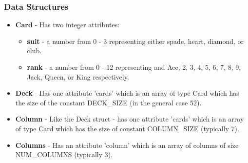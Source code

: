 \documentclass[11]{article}
\begin{document}
			\subsubsection{Data Structures}
				\begin{itemize}
					\item \textbf{Card} - Has two integer attributes:
						\begin{itemize}
							\item \textbf{suit} - a number from 0 - 3 representing either spade, heart, diamond, or club.
							\item \textbf{rank} - a number from 0 - 12 representing and Ace, 2, 3, 4, 5, 6, 7, 8, 9, Jack, Queen, or King respectively.
						\end{itemize}
					
					\item \textbf{Deck} - Has one attribute 'cards' which is an array of type Card which has the size of the constant DECK\_SIZE (in the general case 52).
					
					\item \textbf{Column} - Like the Deck struct - has one attribute 'cards' which is an array of type Card which has the size of constant COLUMN\_SIZE (typically 7).
					
					\item \textbf{Columns} - Has an attribute 'column' which is an array of columns of size NUM\_COLUMNS (typically 3).
				\end{itemize}
\end{document}
